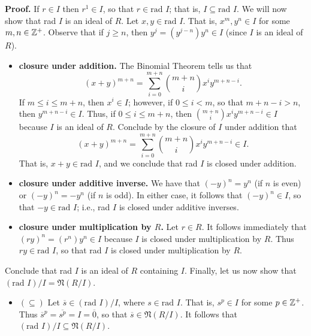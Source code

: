 \begin{enumerate}
      \textbf{Proof.} If $r \in I$ then $r^1 \in I$, so that
      $r \in \text{rad }I$; that is, $I \subseteq \text{rad }I$. We will now
      show that rad $I$ is an ideal of $R$. Let $x, y \in \text{rad }I$. That
      is, $x^m, y^n \in I$ for some $m, n \in \mathbb{Z}^+$. Observe that if $j \ge n$, 
      then $y^j = (y^{j-n})y^n \in I$ (since $I$ is an ideal of $R$).
      \begin{itemize}
         \item \textbf{closure under addition.} The Binomial Theorem tells us
               that
               $$(x + y)^{m + n} = \sum_{i=0}^{m+n}\binom{m+n}{i}x^iy^{m+n-i}.$$
               If $m \le i \le m + n$, then $x^i \in I$; however, if
               $0 \le i < m$, so that $m + n - i > n$, then $y^{m+n-i} \in I$.
               Thus, if $0  \le i \le m + n$, then
               $\binom{m+n}{i}x^iy^{m+n-i} \in I$ because $I$ is an ideal of
               $R$. Conclude by the closure of $I$ under addition that
               $$(x + y)^{m + n} =
                 \sum_{i=0}^{m+n}\binom{m+n}{i}x^iy^{m+n-i} \in I.$$
               That is, $x + y \in \text{rad }I$, and we conclude that rad $I$
               is closed under addition.
         \item \textbf{closure under additive inverse.} We have that
               $(-y)^n = y^n$ (if $n$ is even) or $(-y)^n = -y^n$ (if $n$ is 
               odd). In either case, it follows that $(-y)^n \in I$, so that
               $-y \in \text{rad } I$; i.e., rad $I$ is closed under additive 
               inverses.
         \item \textbf{closure under multiplication by $R$.} Let $r \in R$. It
               follows immediately that $(ry)^n = (r^n)y^n \in I$ because $I$ is 
               closed under multiplication by $R$. Thus $ry \in \text{rad } I$, 
               so that rad $I$ is closed under multiplication by $R$.
      \end{itemize}
      Conclude that rad $I$ is an ideal of $R$ containing $I$. Finally, let us
      now show that $(\text{rad } I)/I = \mathfrak{N}(R/I)$.
      \begin{itemize}
         \item $(\subseteq)$ Let $\overline{s} \in (\text{rad } I)/I$, where
               $s \in \text{rad } I$. That is, $s^p \in I$ for some
               $p \in \mathbb{Z}^+$. Thus $\overline{s}^p = \overline{s^p} = I =
               \overline{0}$, so that $\overline{s} \in \mathfrak{N}(R/I)$. It
               follows that $(\text{rad } I)/I \subseteq \mathfrak{N}(R/I)$.

\end{itemize}
\end{enumerate}
